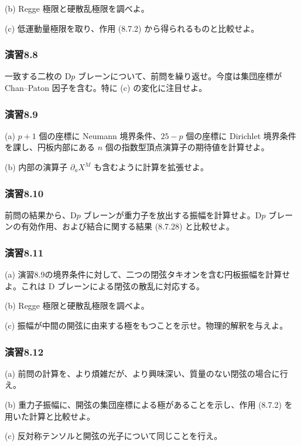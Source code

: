 (b) Regge 極限と硬散乱極限を調べよ。

(c) 低運動量極限を取り、作用 (8.7.2) から得られるものと比較せよ。

\subsubsection*{演習8.8}\label{ex:8.8}
一致する二枚の D$p$ ブレーンについて、前問を繰り返せ。今度は集団座標が Chan--Paton 因子を含む。特に (c) の変化に注目せよ。

\subsubsection*{演習8.9}\label{ex:8.9}
(a) $p+1$ 個の座標に Neumann 境界条件、$25-p$ 個の座標に Dirichlet 境界条件を課し、円板内部にある $n$ 個の指数型頂点演算子の期待値を計算せよ。

(b) 内部の演算子 $\partial_aX^M$ も含むように計算を拡張せよ。

\subsubsection*{演習8.10}\label{ex:8.10}
前問の結果から、D$p$ ブレーンが重力子を放出する振幅を計算せよ。D$p$ ブレーンの有効作用、および結合に関する結果 (8.7.28) と比較せよ。

\subsubsection*{演習8.11}\label{ex:8.11}
(a) 演習8.9の境界条件に対して、二つの閉弦タキオンを含む円板振幅を計算せよ。これは D ブレーンによる閉弦の散乱に対応する。

(b) Regge 極限と硬散乱極限を調べよ。

(c) 振幅が中間の開弦に由来する極をもつことを示せ。物理的解釈を与えよ。

\subsubsection*{演習8.12}\label{ex:8.12}
(a) 前問の計算を、より煩雑だが、より興味深い、質量のない閉弦の場合に行え。

(b) 重力子振幅に、開弦の集団座標による極があることを示し、作用 (8.7.2) を用いた計算と比較せよ。

(c) 反対称テンソルと開弦の光子について同じことを行え。
